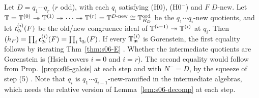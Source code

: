 \begin{conjecture}\label{conj:s06-several}
Let $D=q_1\cdots q_r$ ($r$ odd), with each $q_i$ satisfying (H0), (H0$^-$) and $F$ $D$-new. Let
$\mathbb{T}=\mathbb{T}^{(0)}\twoheadrightarrow\mathbb{T}^{(1)}\twoheadrightarrow\cdots\twoheadrightarrow\mathbb{T}^{(r)}=\mathbb{T}^{D\text{-new}}\cong\mathbb{T}^{\mathrm{ord}}_{B_D}$ be the
$q_1\cdots q_i$-new quotients, and let $\mathfrak{c}^{(i)}_{q_i}(F)$ be the old/new congruence ideal of $\mathbb{T}^{(i-1)}\twoheadrightarrow\mathbb{T}^{(i)}$ at
$q_i$. Then $(h_F)=\prod_i\mathfrak{c}^{(i)}_{q_i}(F)=\prod_i\mathfrak{t}_{q_i}(F)$. \stconj{} If every $\mathbb{T}^{(i)}_{\mathfrak{m}}$ is Gorenstein, the first
equality follows by iterating Thm~\ref{thm:s06-E} \stsketch. Whether the intermediate quotients are Gorenstein is \stopen{} (Hsieh
covers $i=0$ and $i=r$). The second equality would follow from Prop.~\ref{prop:s06-galois} at each step and \cite[Thm~1.1]{KO} with
$N^-=D$, by the squeeze of step (5) \stsketch. Note that $q_i$ is $q_1\cdots q_{i-1}$-new-ramified in the intermediate algebras,
which needs the relative version of Lemma~\ref{lem:s06-decomp} at each step.
\end{conjecture}

